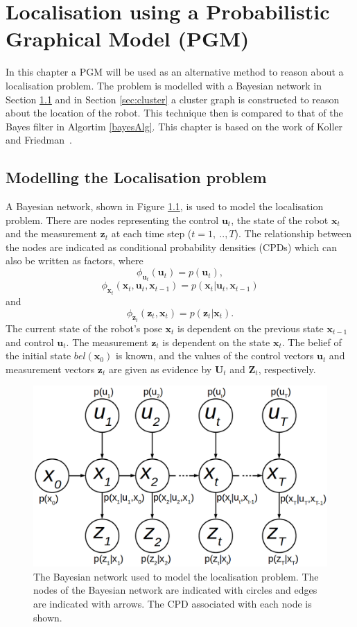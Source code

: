 \documentclass[12pt,oneside,openany,a4paper, %
afrikaans,english,
]{memoir}
\numberwithin{equation}{chapter}
\begin{document}
{\chapter{Localisation using a Probabilistic Graphical Model (PGM)}\label{chap:pgmLoc}
In this chapter a PGM will be used as an alternative method to reason about a localisation problem. The problem is modelled with a Bayesian network in Section \ref{sec:model} and in Section \ref{sec:cluster} a cluster graph is constructed to reason about the location of the robot. This technique then is compared to that of the Bayes filter in Algortim \ref{bayesAlg}. This chapter is based on the work of Koller and Friedman~\cite{koller}.

\section{Modelling the Localisation problem}\label{sec:model}
A Bayesian network, shown in Figure \ref{fig:loc_bayes}, is used to model the localisation problem. There are nodes representing the control $\bm{u}_t$, the state of the robot $\bm{x}_t$ and the measurement $\bm{z}_t$ at each time step ($t = 1,\ ..,T$). The relationship between the nodes are indicated as conditional probability densities (CPDs) which can also be written as factors, where
\begin{equation}
\phi_{\bm{u}_t}(\bm{u}_t) = p(\bm{u}_t),
\end{equation}
\begin{equation}
\phi_{\bm{x}_t}(\bm{x}_t, \bm{u}_t, \bm{x}_{t-1}) = p(\bm{x}_t| \bm{u}_t, \bm{x}_{t-1}) 
\end{equation}
and
\begin{equation}
\phi_{\bm{z}_t}(\bm{z}_t, \bm{x}_t) = p(\bm{z}_t|\bm{x}_t). 
\end{equation}
The current state of the robot's pose $\bm{x}_t$ is dependent on the previous state $\bm{x}_{t-1}$ and control $\bm{u}_t$. The measurement $\bm{z}_t$ is dependent on the state $\bm{x}_t$. The belief of the initial state $bel(\bm{x}_0)$ is known, and the values of the control vectors $\bm{u}_t$ and measurement vectors $\bm{z}_t$ are given as evidence by $\bm{U}_t$ and $\bm{Z}_t$, respectively.

\begin{figure}
  \includegraphics[width=0.7\linewidth]{Figures/bayesnetloc.png}
  \centering
  \caption[Bayesian network of the localisation problem]{The Bayesian network used to model the localisation problem. The nodes of the Bayesian network are indicated with circles and edges are indicated with arrows. The CPD associated with each node is shown.}
  \label{fig:loc_bayes}
\end{figure}
}
\end{document}
